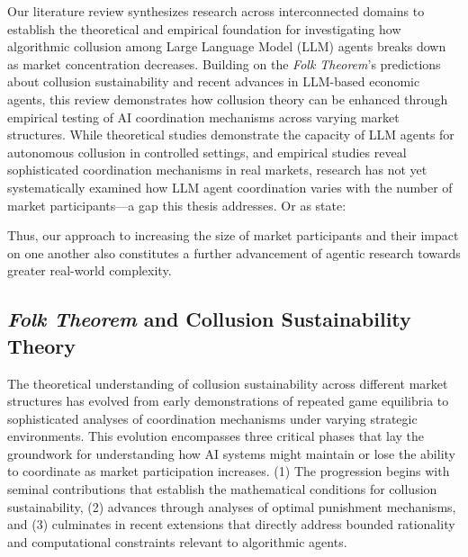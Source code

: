 Our literature review synthesizes research across interconnected domains to establish the theoretical and empirical foundation for investigating how algorithmic collusion among Large Language Model (LLM) agents breaks down as market concentration decreases. Building on the \emph{Folk Theorem}'s predictions about collusion sustainability and recent advances in LLM-based economic agents, this review demonstrates how collusion theory can be enhanced through empirical testing of AI coordination mechanisms across varying market structures. While theoretical studies demonstrate the capacity of LLM agents for autonomous collusion in controlled settings, and empirical studies reveal sophisticated coordination mechanisms in real markets, research has not yet systematically examined how LLM agent coordination varies with the number of market participants---a gap this thesis addresses. Or as \textcite[p.24]{fish_algorithmic_2025} state:
\begin{displayquote}
\end{displayquote}

Thus, our approach to increasing the size of market participants and their impact on one another also constitutes a further advancement of agentic research towards greater real-world complexity.

\subsection{\emph{Folk Theorem} and Collusion Sustainability Theory}

The theoretical understanding of collusion sustainability across different market structures has evolved from early demonstrations of repeated game equilibria to sophisticated analyses of coordination mechanisms under varying strategic environments. This evolution encompasses three critical phases that lay the groundwork for understanding how AI systems might maintain or lose the ability to coordinate as market participation increases. (1) The progression begins with seminal contributions that establish the mathematical conditions for collusion sustainability, (2) advances through analyses of optimal punishment mechanisms, and (3) culminates in recent extensions that directly address bounded rationality and computational constraints relevant to algorithmic agents.

